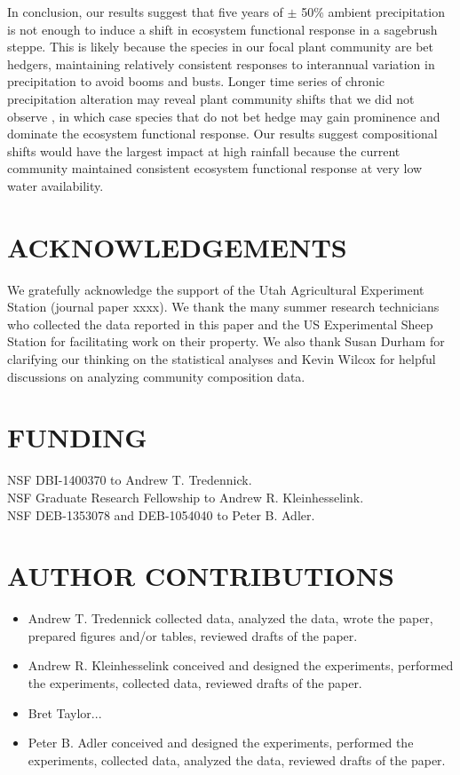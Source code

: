 \documentclass[fleqn,10pt,lineno]{wlpeerj} %
\begin{document}
In conclusion, our results suggest that five years of \(\pm\) 50\%
ambient precipitation is not enough to induce a shift in ecosystem
functional response in a sagebrush steppe. This is likely because the
species in our focal plant community are bet hedgers, maintaining
relatively consistent responses to interannual variation in
precipitation to avoid booms and busts. Longer time series of chronic
precipitation alteration may reveal plant community shifts that we did
not observe \citep[e.g.,][]{Wilcox2016}, in which case species that do
not bet hedge may gain prominence and dominate the ecosystem functional
response. Our results suggest compositional shifts would have the
largest impact at high rainfall because the current community maintained
consistent ecosystem functional response at very low water availability.

\section{ACKNOWLEDGEMENTS}\label{acknowledgements}

We gratefully acknowledge the support of the Utah Agricultural
Experiment Station (journal paper xxxx). We thank the many summer
research technicians who collected the data reported in this paper and
the US Experimental Sheep Station for facilitating work on their
property. We also thank Susan Durham for clarifying our thinking on the
statistical analyses and Kevin Wilcox for helpful discussions on
analyzing community composition data.

\section{FUNDING}\label{funding}

NSF DBI-1400370 to Andrew T. Tredennick.\\
NSF Graduate Research Fellowship to Andrew R. Kleinhesselink.\\
NSF DEB-1353078 and DEB-1054040 to Peter B. Adler.

\section{AUTHOR CONTRIBUTIONS}\label{author-contributions}

\begin{itemize}
  \item Andrew T. Tredennick collected data, analyzed the data, wrote the paper, prepared figures and/or tables, reviewed
drafts of the paper.
  \item Andrew R. Kleinhesselink conceived and designed the experiments, performed the experiments, collected data, reviewed drafts of the paper.
  \item Bret Taylor...
  \item Peter B. Adler conceived and designed the experiments, performed the experiments, collected data, analyzed the data, reviewed
drafts of the paper.
\end{itemize}
\end{document}
